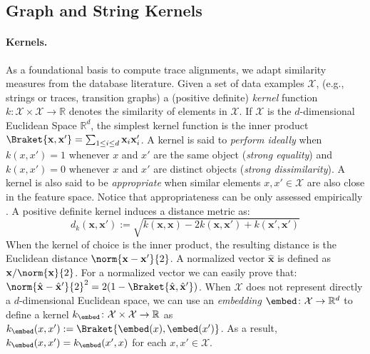 \subsection{Graph and String Kernels}\label{subsec:katk}

\paragraph*{Kernels.} As a foundational basis to compute trace alignments, we adapt similarity measures from the database literature.  Given a set of data examples $\mathcal{X}$, (e.g., strings or traces, transition graphs) a (positive definite) \emph{kernel} function $k\colon \mathcal{X}\times \mathcal{X}\to \mathbb{R}$ denotes the similarity of elements in $\mathcal{X}$. If $\mathcal{X}$ is the $d$-dimensional Euclidean Space $\mathbb{R}^d$, the simplest kernel function is the inner product $\Braket{\mathbf{x},\mathbf{x}'}=\sum_{1\leq i\leq d}\mathbf{x}_i\mathbf{x}'_i$.
A kernel is said to \emph{perform ideally} \cite{Gartner03} when $k(x,x')=1$ whenever $x$ and $x'$ are the same object (\textit{strong equality}) and $k(x,x')=0$ whenever $x$ and $x'$ are distinct objects (\textit{strong dissimilarity}). A kernel is also said to be \emph{appropriate} when similar elements $x,x'\in\mathcal{X}$ are also close in the feature space. Notice that appropriateness can be only assessed  empirically \cite{Gartner03}.
A positive definite kernel induces a distance metric as:
\begin{equation}\label{eq:dofk}
d_k(\mathbf{x},\mathbf{x}'):=\sqrt{k(\mathbf{x},\mathbf{x})-2k(\mathbf{x},\mathbf{x}')+k(\mathbf{x}',\mathbf{x}')}
\end{equation}
When the kernel of choice is the inner product, the resulting distance is the Euclidean distance $\norm{\mathbf{x}-\mathbf{x}'}{2}$. A normalized vector $\hat{\mathbf{x}}$ is defined as $\mathbf{x}/\norm{\mathbf{x}}{2}$. For a normalized vector we can easily prove that: $\norm{\hat{\mathbf{x}}-\hat{\mathbf{x}}'}{2}^2=2(1-\Braket{\hat{\mathbf{x}},\hat{\mathbf{x}}'})$.
When $\mathcal{X}$ does not represent directly a $d$-dimensional Euclidean space, we can use an \emph{embedding} $\embed\colon\mathcal{X}\to \mathbb{R}^d$ to define a kernel $k_\embed\colon \mathcal{X}\times \mathcal{X}\to\mathbb{R}$ as $k_\embed(x,x'):=\Braket{\embed(x),\embed(x')}$. As a result, $k_\embed(x,x')=k_\embed(x',x)$ for each $x,x'\in\mathcal{X}$.


